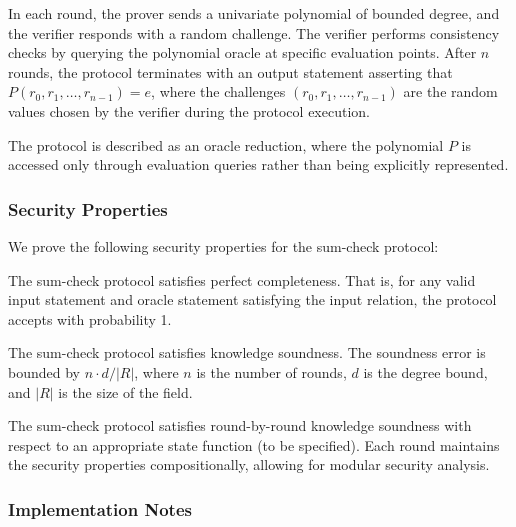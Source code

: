 In each round, the prover sends a univariate polynomial of bounded degree, and the verifier responds with a random challenge. The verifier performs consistency checks by querying the polynomial oracle at specific evaluation points. After $n$ rounds, the protocol terminates with an output statement asserting that $P(r_0, r_1, \ldots, r_{n-1}) = e$, where the challenges $(r_0, r_1, \ldots, r_{n-1})$ are the random values chosen by the verifier during the protocol execution.

The protocol is described as an oracle reduction, where the polynomial $P$ is accessed only through evaluation queries rather than being explicitly represented.

\subsubsection{Security Properties}

We prove the following security properties for the sum-check protocol:

\begin{theorem}
    \label{thm:sumcheck_perfect_completeness}
    The sum-check protocol satisfies perfect completeness. That is, for any valid input statement and oracle statement satisfying the input relation, the protocol accepts with probability 1.
\end{theorem}

\begin{theorem}
    \label{thm:sumcheck_knowledge_soundness}
    The sum-check protocol satisfies knowledge soundness. The soundness error is bounded by $n \cdot d / |R|$, where $n$ is the number of rounds, $d$ is the degree bound, and $|R|$ is the size of the field.
\end{theorem}

\begin{theorem}
    \label{thm:sumcheck_rbr_knowledge_soundness_standard}
    The sum-check protocol satisfies round-by-round knowledge soundness with respect to an appropriate state function (to be specified). Each round maintains the security properties compositionally, allowing for modular security analysis.
\end{theorem}

\subsubsection{Implementation Notes}

